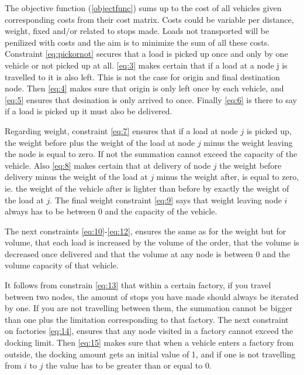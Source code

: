 \documentclass[../main.tex]{subfiles}
\begin{document}
\par
The objective function (\ref{objectfunc}) sums up to the cost of all vehicles given corresponding costs from their cost matrix. Costs could be variable per distance, weight, fixed and/or related to stops made. Loads not transported will be penilized with costs and the aim is to minimize the sum of all these costs.
Constraint \ref{eq:pickornot} secures that a load is picked up once and only by one vehicle or not picked up at all. 
\ref{eq:3} makes certain that if a load at a node j is travelled to it is also left. This is not the case for origin and final destination node.
Then \ref{eq:4} makes sure that origin is only left once by each vehicle, 
and \ref{eq:5} ensures that desination is only arrived to once.
Finally \ref{eq:6} is there to say if a load is picked up it must also be delivered. \par

Regarding weight, constraint \ref{eq:7} ensures that if a load at node $j$ is picked up, the weight before plus the weight of the load at node $j$ minus the weight leaving the node is equal to zero. If not the summation cannot exceed the capacity of the vehicle.
Also \ref{eq:8} makes certain that at delivery of node $j$ the weight before delivery minus the weight of the load at $j$ minus the weight after, is equal to zero, ie. the weight of the vehicle after is lighter than before by exactly the weight of the load at $j$. 
The final weight constraint \ref{eq:9} says that weight leaving node $i$ always has to be between $0$ and the capacity of the vehicle. \par

The next constraints \ref{eq:10}-\ref{eq:12}, ensures the same as for the weight but for volume, that each load is increased by the volume of the order, that the volume is decreased once delivered and that the volume at any node is between $0$ and the volume capacity of that vehicle.

It follows from constrain \ref{eq:13} that within a certain factory, if you travel between two nodes, the amount of stops you have made should always be iterated by one. 
If you are not travelling between them, the summation cannot be bigger than one plus the limitation corresponding to that factory.
The next constraint on factories \ref{eq:14}, ensures that any node visited in a factory cannot exceed the docking limit.
Then \ref{eq:15} makes sure that when a vehicle enters a factory from outside, the docking amount gets an initial value of 1, and if one is not travelling from $i$ to $j$ the value has to be greater than or equal to 0. \par
\end{document}
